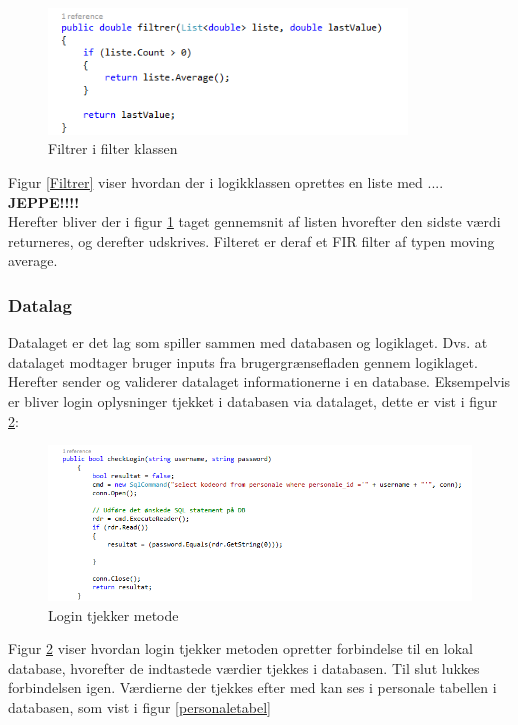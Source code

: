 \begin{figure}[H]
	\centering
	\includegraphics[width=0.85\textwidth]{Figurer/SoftwareImplementering/filtrer}
	\caption{Filtrer i filter klassen}
	\label{filtrer}
\end{figure}

Figur \ref{Filtrer} viser hvordan der i logikklassen oprettes en liste med .... \textbf{JEPPE!!!!}\\
Herefter bliver der i figur \ref{filtrer} taget gennemsnit af listen hvorefter den sidste værdi returneres, og derefter udskrives. Filteret er deraf et FIR filter af typen moving average.

\subsubsection{Datalag}\label{Datalag}
Datalaget er det lag som spiller sammen med databasen og logiklaget. Dvs. at datalaget modtager bruger inputs fra brugergrænsefladen gennem logiklaget. Herefter sender og validerer datalaget informationerne i en database. Eksempelvis er bliver login oplysninger tjekket i databasen via datalaget, dette er vist i figur \ref{Datalogin}:

\begin{figure}[H]
	\centering
	\includegraphics[width=1.4\textwidth]{Figurer/SoftwareImplementering/CheckLogind}
	\caption{Login tjekker metode}
	\label{Datalogin}
\end{figure}

Figur \ref{Datalogin} viser hvordan login tjekker metoden opretter forbindelse til en lokal database, hvorefter de indtastede værdier tjekkes i databasen. Til slut lukkes forbindelsen igen. Værdierne der tjekkes efter med kan ses i personale tabellen i databasen, som vist i figur \ref{personaletabel}

